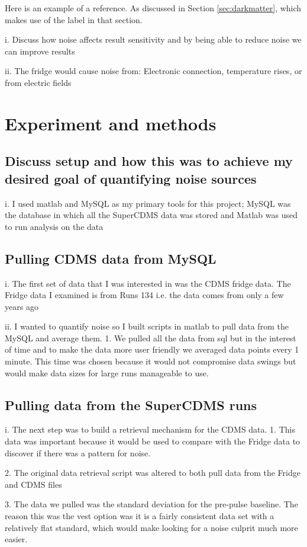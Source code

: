 Here is an example of a reference.  As discussed in Section \ref{sec:darkmatter}, which makes use of the label in that section.

i.	Discuss how noise affects result sensitivity and by being able to reduce noise we can improve results 

ii.	The fridge would cause noise from: Electronic connection, temperature rises, or from electric fields

\section{Experiment and methods} 

\subsection{Discuss setup and how this was to achieve my desired goal of quantifying noise sources}
i.	I used matlab and MySQL as my primary tools for this project; MySQL was the database in which all the SuperCDMS data was stored and Matlab was used to run analysis on the data

\subsection{Pulling CDMS data from MySQL}
i.	The first set of data that I was interested in was the CDMS fridge data. The Fridge data I examined is from Runs 134 i.e. the data comes from only a few years ago

ii.	I wanted to quantify noise so I built scripts in matlab to pull data from the MySQL and average them.
1.	We pulled all the data from sql but in the interest of time and to make the data more user friendly we averaged data points every 1 minute. This time was chosen because it would not compromise data swings but would make data sizes for large runs manageable to use. 

\subsection{Pulling data from the SuperCDMS runs}
i.	The next step was to build a retrieval mechanism for the CDMS data. 
1.	This data was important because it would be used to compare with the Fridge data to discover if there was a pattern for noise.

2.	The original data retrieval script was altered to both pull data from the Fridge and CDMS files

3.	The data we pulled was the standard deviation for the pre-pulse baseline. The reason this was the vest option was it is a fairly consistent data set with a relatively flat standard, which would make looking for a noise culprit much more easier. 

